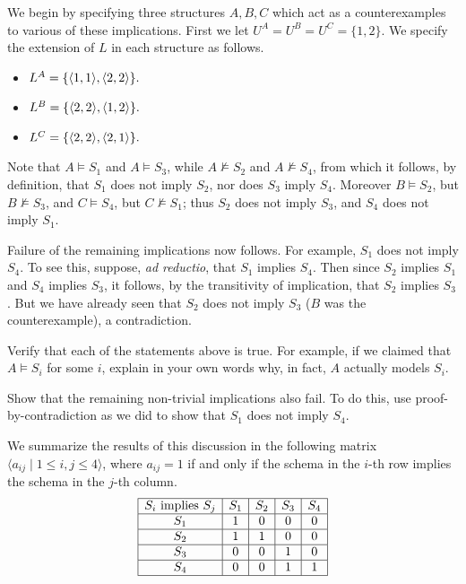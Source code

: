 We begin by specifying three structures $A,B,C$ which act as a counterexamples to various of these implications. First we let $U^A=U^B=U^C=\{1,2\}$. We specify the extension of $L$ in each structure as follows.%
\begin{itemize}
\item $L^A=\{\mbox{$\langle 1,1 \rangle$},\mbox{$\langle 2,2 \rangle$}\}.$
\item $L^B=\{\mbox{$\langle 2,2 \rangle$},\mbox{$\langle 1,2 \rangle$}\}.$
\item $L^C=\{\mbox{$\langle 2,2 \rangle$},\mbox{$\langle 2,1 \rangle$}\}.$
\end{itemize} 
\iffalse
\[
\begin{array}{| c | c | c |}
\hline
 \mbox{Structure}& \mbox{Universe} & \mbox{Extension of }L\\
  \hline            
  A & \{a,b\} & \{\op{a}{a},\op{b}{b}\}\\
  \hline
  B & \{a,b\} & \{\op{b}{b},\op{a}{b}\}\\
 \hline
 C & \{a,b\} & \{\op{b}{b},\op{b}{a}\}\\
 \hline  
\end{array}
\]
\fi
Note that $A\models S_1$ and $A\models S_3$, while $A\not\models S_2$ and $A\not\models S_4$, from which it follows, by definition, that $S_1$ does not imply $S_2$, nor does $S_3$ imply $S_4$. Moreover $B\models S_2$, but $B\not\models S_3$, and $C\models S_4$, but $C\not\models S_1$; thus $S_2$ does not imply $S_3$, and $S_4$ does not imply $S_1$. 

Failure of the remaining %
implications now follows. For example, $S_1$ does not imply $S_4$. To see this, suppose, \emph{ad reductio}, that $S_1$ implies $S_4$. Then since $S_2$ implies $S_1$ and $S_4$ implies $S_3$, it follows, by the transitivity of implication, that $S_2$ implies $S_3$. But we have already seen that $S_2$ does not imply $S_3$ ($B$ was the counterexample), a contradiction.

\begin{aside}
    Verify that each of the statements above is true. For example, if we claimed that $A \models S_i$ for some $i$, explain in your own words why, in fact, $A$ actually models $S_i$.  

    Show that the remaining non-trivial implications also fail. To do this, use proof-by-contradiction as we did to show that $S_1$ does not imply $S_4$. 
\end{aside}

We summarize the results of this discussion in the following matrix $\langle a_{ij}\mid 1\leq i,j\leq 4\rangle$, where $a_{ij} = 1$ if and only if the schema in the $i$-th row implies the schema in the $j$-th column.
\[
\begin{array}{| c | c | c | c | c|}
\hline
 S_i\mbox{ implies }S_j& S_1 & S_2 & S_3 & S_4\\
  \hline            
  S_1 & 1 & 0 & 0 & 0\\
  \hline
  S_2  & 1 & 1 & 0 & 0\\
 \hline
 S_3 & 0 & 0 & 1 & 0\\
 \hline
 S_4 & 0 & 0 & 1 & 1\\
 \hline  
\end{array}
\]


